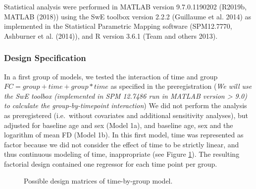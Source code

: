 \documentclass[
]{article}
\begin{document}
Statistical analysis were performed in MATLAB version 9.7.0.1190202 (R2019b, MATLAB (2018)) using the SwE toolbox version 2.2.2 (Guillaume et al. 2014) as implemented in the Statistical Parametric Mapping software (SPM12.7770, Ashburner et al. (2014)), and R version 3.6.1 (Team and others 2013).

\hypertarget{design-specification}{%
\subsubsection{Design Specification}\label{design-specification}}

In a first group of models, we tested the interaction of time and group \(FC = group + time + group*time\) as specified in the preregistration (\emph{We will use the SwE toolbox (implemented in SPM 12.7486 run in MATLAB version \textgreater{} 9.0) to calculate the group-by-timepoint interaction})
We did not perform the analysis as preregistered (i.e.~without covariates and additional sensitivity analyses), but adjusted for baseline age and sex (Model 1a), and baseline age, sex and the logarithm of mean FD (Model 1b).
In this first model, time was represented as factor because we did not consider the effect of time to be strictly linear, and thus continuous modeling of time, inappropriate (see Figure \ref{fig:figDesignmatrix}). The resulting factorial design contained one regressor for each time point per group.

\begin{figure}

{\centering {}

}

\caption{Possible design matrices of time-by-group model.}\label{fig:figDesignmatrix}
\end{figure}
\end{document}
